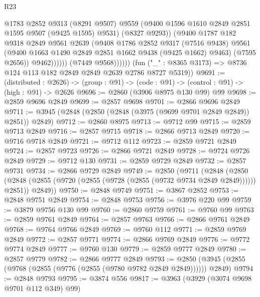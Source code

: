 \begin{lexlean}{R23}
\begin{coremodule}
                            @1783
                            @2852
                            @9313
                            (@8291 @9507)
                            @9559
                            (@9400 @1596 @1610 @2849 @2851 @1595 @9507 (@9425 @1595) @9531)
                            (@8327 @9293))
                          (@9400
                            @1787
                            @182
                            @9318
                            @2849
                            @9561
                            @2639
                            (@9408
                              @1786
                              @2852
                              @9317
                              (@7516 @9438)
                              @9561
                              (@9400 @1663 @1490 @2849 @2851 @1662 @9438 (@9425 @1662) @9463)
                              (@7595 @2656))
                            @9462))))))
                (@7449 @9568))))))
      (fun ("_" : @8365 @3173) => @8736 @124 @113 @182 @2849 @2849 @2639 @2786 @8727 @5319))
@9691 := (distributed : @2626) ->
  (group : @91) -> (code : @91) -> (control : @91) -> (high : @91) -> @2626
@9696 := @2860 (@3906 @8975 @130 @99) @99
@9698 := @2859 @9696 @2849
@9699 := @2857 @9698
@9701 := @2866 @9696 @2849
@9711 := @3945 (@2848 (@2850 (@2848 (@3975 (@9699 @9701 @2849 @2849)) @2851)) @2849)
@9712 := @2860 @8975
@9713 := @9712 @99
@9715 := @2859 @9713 @2849
@9716 := @2857 @9715
@9718 := @2866 @9713 @2849
@9720 := @9716 @9718 @2849
@9721 := @9712 @112
@9723 := @2859 @9721 @2849
@9724 := @2857 @9723
@9726 := @2866 @9721 @2849
@9728 := @9724 @9726 @2849
@9729 := @9712 @130
@9731 := @2859 @9729 @2849
@9732 := @2857 @9731
@9734 := @2866 @9729 @2849
@9749 := @2850
    (@9711
      (@2848
        (@2850 (@2848 (@2855 (@9720 (@2855 (@9728 (@2855 (@9732 @9734 @2849 @2849)))))) @2851))
        @2849))
@9750 := @2848 @9749
@9751 := @3867 @2852
@9753 := @2848 @9751 @2849
@9754 := @2848 @9753
@9756 := @3976 @220 @99
@9759 := @3879 @9756 @130 @99
@9760 := @2860 @9759
@9761 := @9760 @99
@9763 := @2859 @9761 @2849
@9764 := @2857 @9763
@9766 := @2866 @9761 @2849
@9768 := @9764 @9766 @2849
@9769 := @9760 @112
@9771 := @2859 @9769 @2849
@9772 := @2857 @9771
@9774 := @2866 @9769 @2849
@9776 := @9772 @9774 @2849
@9777 := @9760 @130
@9779 := @2859 @9777 @2849
@9780 := @2857 @9779
@9782 := @2866 @9777 @2849
@9793 := @2850 (@3945 (@2855 (@9768 (@2855 (@9776 (@2855 (@9780 @9782 @2849 @2849)))))) @2849)
@9794 := @2848 @9793
@9795 := @3874 @556
@9817 := @3963
    (@3929 (@3074 @9698 @9701 @112 @349) @99)

\end{coremodule}
\end{lexlean}
